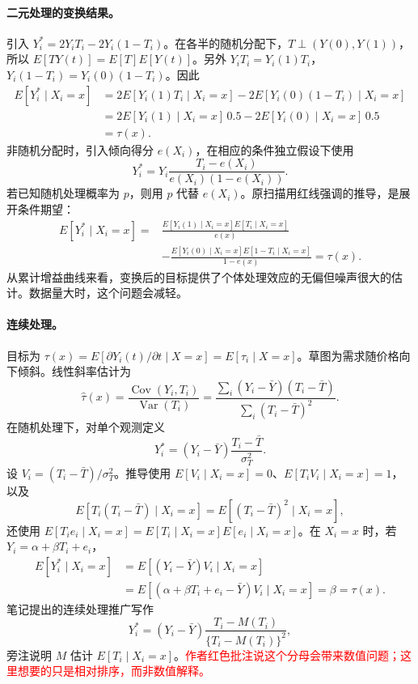 \documentclass[11pt,a4paper]{article}
\newcommand{\inkred}[1]{\textcolor{red}{#1}}
\begin{document}
{\paragraph{二元处理的变换结果。}
引入 $Y_i^*=2Y_iT_i-2Y_i(1-T_i)$。在各半的随机分配下，$T\perp(Y(0),Y(1))$，所以 $E[TY(t)]=E[T]E[Y(t)]$。另外 $Y_iT_i=Y_i(1)T_i$，$Y_i(1-T_i)=Y_i(0)(1-T_i)$。因此
\begin{align*}
E[Y_i^*\mid X_i=x]
&=2E[Y_i(1)T_i\mid X_i=x]-2E[Y_i(0)(1-T_i)\mid X_i=x]\\
&=2E[Y_i(1)\mid X_i=x]\,0.5-2E[Y_i(0)\mid X_i=x]\,0.5\\
&=\tau(x).
\end{align*}
非随机分配时，引入倾向得分 $e(X_i)$，在相应的条件独立假设下使用
\[Y_i^*=Y_i\frac{T_i-e(X_i)}{e(X_i)(1-e(X_i))}.\]
若已知随机处理概率为 $p$，则用 $p$ 代替 $e(X_i)$。原扫描用红线强调的推导，是展开条件期望：
\begin{align*}
E[Y_i^*\mid X_i=x]
={}&\frac{E[Y_i(1)\mid X_i=x]E[T_i\mid X_i=x]}{e(x)}\\
&-\frac{E[Y_i(0)\mid X_i=x]E[1-T_i\mid X_i=x]}{1-e(x)}=\tau(x).
\end{align*}
从累计增益曲线来看，变换后的目标提供了个体处理效应的无偏但噪声很大的估计。数据量大时，这个问题会减轻。

\paragraph{连续处理。}
目标为 $\tau(x)=E[\partial Y_i(t)/\partial t\mid X=x]=E[\tau_i\mid X=x]$。草图为需求随价格向下倾斜。线性斜率估计为
\[\hat\tau(x)=\frac{\operatorname{Cov}(Y_i,T_i)}{\operatorname{Var}(T_i)}
=\frac{\sum_i(Y_i-\bar Y)(T_i-\bar T)}{\sum_i(T_i-\bar T)^2}.
\]
在随机处理下，对单个观测定义
\[Y_i^*=(Y_i-\bar Y)\frac{T_i-\bar T}{\sigma_T^2}.\]
设 $V_i=(T_i-\bar T)/\sigma_T^2$。推导使用 $E[V_i\mid X_i=x]=0$、$E[T_iV_i\mid X_i=x]=1$，以及
\[E[T_i(T_i-\bar T)\mid X_i=x]=E[(T_i-\bar T)^2\mid X_i=x],\]
还使用 $E[T_ie_i\mid X_i=x]=E[T_i\mid X_i=x]E[e_i\mid X_i=x]$。在 $X_i=x$ 时，若 $Y_i=\alpha+\beta T_i+e_i$，
\begin{align*}
E[Y_i^*\mid X_i=x]
&=E[(Y_i-\bar Y)V_i\mid X_i=x]\\
&=E[(\alpha+\beta T_i+e_i-\bar Y)V_i\mid X_i=x]=\beta=\tau(x).
\end{align*}
笔记提出的连续处理推广写作
\[Y_i^*=(Y_i-\bar Y)\frac{T_i-M(T_i)}{\{T_i-M(T_i)\}^2},\]
旁注说明 $M$ 估计 $E[T_i\mid X_i=x]$。\inkred{作者红色批注说这个分母会带来数值问题；这里想要的只是相对排序，而非数值解释。}

}
\end{document}
